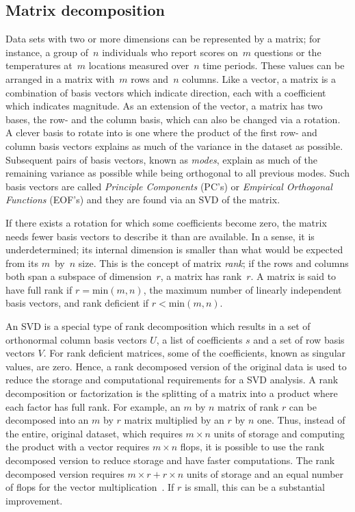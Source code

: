 \documentclass[ijgi,article,submit,moreauthors,pdftex,10pt,a4paper]{Definitions/mdpi}
\begin{document}
\subsection{Matrix decomposition}
\label{sec:Introduction/Matrix decompostion}

Data sets with two or more dimensions can be represented by a matrix; for instance, a group of~$n$ individuals who report scores on~$m$ questions or the temperatures at~$m$ locations measured over~$n$ time periods. These values can be arranged in a matrix with~$m$ rows and~$n$ columns. Like a vector, a matrix is a combination of basis vectors which indicate direction, each with a coefficient which indicates magnitude. As an extension of the vector, a matrix has two bases, the row- and the column basis, which can also be changed via a rotation. A clever basis to rotate into is one where the product of the first row- and column basis vectors explains as much of the variance in the dataset as possible. Subsequent pairs of basis vectors, known as \textit{modes}, explain as much of the remaining variance as possible while being orthogonal to all previous modes. Such basis vectors are called \textit{Principle Components} (PC's) or \textit{Empirical Orthogonal Functions} (EOF's) and they are found via an SVD of the matrix.

If there exists a rotation for which some coefficients become zero, the matrix needs fewer basis vectors to describe it than are available. In a sense, it is underdetermined; its internal dimension is smaller than what would be expected from its $m$~by~$n$ size. This is the concept of matrix \textit{rank}; if the rows and columns both span a subspace of dimension~$r$, a matrix has rank~$r$. A matrix is said to have full rank if $r = \text{min}(m, n)$, the maximum number of linearly independent basis vectors, and rank deficient if $r < \text{min}(m, n)$. 

An SVD is a special type of rank decomposition which results in a set of orthonormal column basis vectors $U$, a list of coefficients $s$ and a set of row basis vectors $V$. For rank deficient matrices, some of the coefficients, known as singular values, are zero. Hence, a rank decomposed version of the original data is used to reduce the storage and computational requirements for a SVD analysis. A rank decomposition or factorization is the splitting of a matrix into a product where each factor has full rank. For example, an $m$ by $n$ matrix of rank $r$ can be decomposed into an $m$ by $r$ matrix multiplied by an $r$ by $n$ one. Thus, instead of the entire, original dataset, which requires $m \times n$ units of storage and computing the product with a vector requires $m \times n$ flops, it is possible to use the rank decomposed version to reduce storage and have faster computations. The rank decomposed version requires $m \times r + r \times n$ units of storage and an equal number of flops for the vector multiplication~\cite{Martinsson2016}. If $r$ is small, this can be a substantial improvement. 
\end{document}
